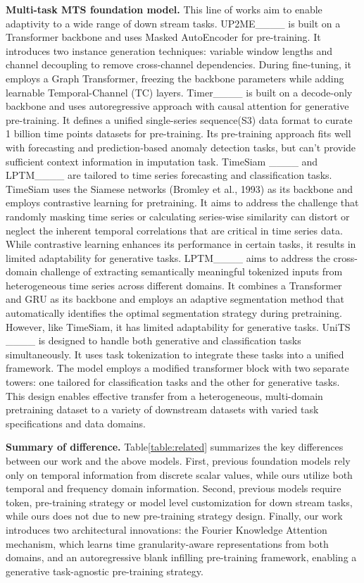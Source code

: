{\bf Multi-task MTS foundation model.} 
This line of works aim to enable adaptivity to a wide 
range of down stream tasks.
UP2ME____ is built on a Transformer backbone and 
uses Masked AutoEncoder for pre-training.  
It introduces two instance generation techniques: variable window lengths and channel decoupling to remove cross-channel dependencies. During fine-tuning, it employs a Graph Transformer, freezing the backbone parameters while adding learnable Temporal-Channel (TC) layers. 
Timer____ is built on a decode-only backbone and uses autoregressive approach with causal attention 
for generative pre-training. 
It defines a unified single-series sequence(S3) data format to curate 1 billion time points datasets for pre-training.  
Its pre-training approach fits well with forecasting and prediction-based anomaly detection tasks, but can’t provide sufficient context information in imputation task.  
TimeSiam ____ and LPTM____ are 
tailored to time series forecasting and classification tasks. 
TimeSiam uses the 
Siamese networks (Bromley et al., 1993) as its backbone and employs contrastive learning for pretraining. It aims to address the challenge that randomly masking time series or calculating series-wise similarity can distort or neglect the inherent temporal correlations that are critical in time series data. While contrastive learning enhances its performance in certain tasks, it results in limited adaptability for generative tasks.
LPTM____ aims to address the cross-domain challenge of extracting semantically meaningful tokenized inputs from heterogeneous time series across different domains. It combines a Transformer and GRU as its backbone and employs an adaptive segmentation method that automatically identifies the optimal segmentation strategy during pretraining. However, like TimeSiam, it has limited adaptability for generative tasks.   
UniTS ____ is designed to handle both generative and classification tasks simultaneously. It uses task tokenization to integrate these tasks into a unified framework. The model employs a modified transformer block with two separate towers: one tailored for classification tasks and the other for generative tasks. This design enables effective transfer from a heterogeneous, multi-domain pretraining dataset to a variety of downstream datasets with varied task specifications and data domains.

 
{\bf Summary of difference.}   
Table\ref{table:related} summarizes the key differences between our work and the above models.
First, previous foundation models rely only on temporal information from discrete scalar values, while ours utilize both temporal and frequency domain information. 
Second, previous models require token, pre-training strategy or model level customization for down stream tasks, 
while ours does not due to new pre-training strategy design.   
Finally, our work introduces two architectural innovations: the Fourier Knowledge Attention mechanism, which learns time granularity-aware representations from both domains, and an autoregressive blank infilling pre-training framework, enabling a generative task-agnostic pre-training strategy.